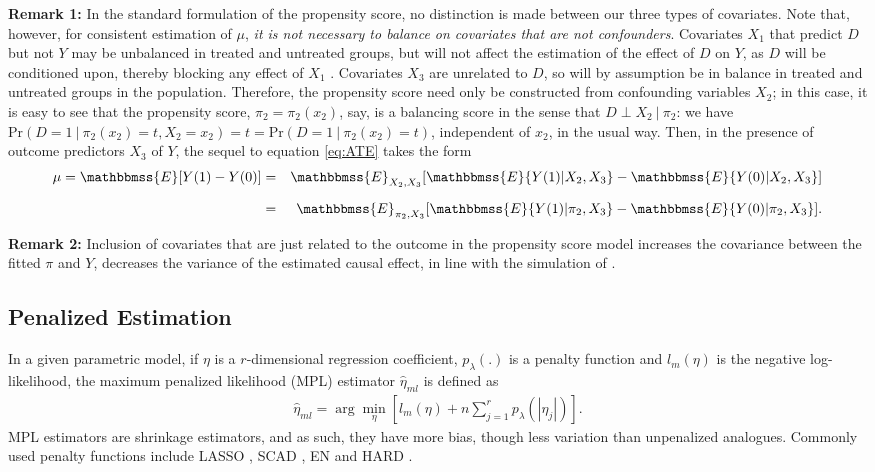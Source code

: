 \documentclass[11pt]{statsoc}
\begin{document}
\medskip

\noindent \textbf{Remark 1:} In the standard formulation of the propensity score, no distinction is made between our three types of covariates.  Note that, however, for consistent estimation of $\mu$, \textit{it is not necessary to
balance on covariates that are not confounders}. Covariates $X_1$ that predict $D$ but not $Y$ may be unbalanced in treated and untreated groups, but will not affect the estimation of the effect of $D$ on $Y$, as $D$ will be conditioned
upon, thereby blocking any effect of $X_1$ \citep{de2011covariate}.  Covariates $X_3$ are unrelated to
$D$, so will by assumption be in balance in treated and untreated groups in the population. Therefore, the propensity score need only be constructed from confounding variables $X_2$; in this case, it is easy to see that the
propensity score, $\pi_{2}=\pi_2(x_2) $, say, is a balancing score in the sense that $D\perp X_2 \: | \: \pi_{2}$:  we have ${\text{Pr}}(D=1\:|\:\pi_{2}(x_2)=t,X_2=x_2) = t =
{\text{Pr}}(D=1\:|\:\pi_{2}(x_2)=t)$, independent of $x_2$, in the usual way.  Then, in the presence of outcome predictors $X_3$ of $Y$, the sequel to equation \eqref{eq:ATE}
takes the form
\begin{eqnarray}
\mu = {\mathbbmss{E}}[Y(1)-Y(0)] & = & {\mathbbmss{E}}_{X_2,X_3}[{\mathbbmss{E}}\{Y(1)|X_2,X_3\}-{\mathbbmss{E}}\{Y(0)|X_2,X_3\}] \nonumber\\[6pt]
& = & {\mathbbmss{E}}_{\pi_{2},X_3}[{\mathbbmss{E}}\{Y(1)|\pi_{2},X_3\}-{\mathbbmss{E}}\{Y(0)|\pi_{2},X_3\}].
\label{eq:ATE2}
\end{eqnarray}

\noindent \textbf{Remark 2:} Inclusion of covariates that are just related to the outcome in the propensity score model increases the covariance between the fitted $\pi$ and $Y$, decreases the variance of the estimated causal effect, in line with the simulation of \cite{brookhart2006variable}.  

\subsection{Penalized Estimation}

In a given parametric model, if $\eta$ is a $r$-dimensional regression coefficient,  $p_{\lambda}(.)$ is a penalty function and $l_m(\eta)$ is the negative log-likelihood, the maximum penalized likelihood (MPL) estimator $\widehat \eta_{ml}$ is defined as
\begin{align*}
\widehat \eta_{ml}=\arg \min_{\eta} \left [l_m(\eta)+n\sum_{j=1}^r p_{\lambda}(|\eta_j|) \right ].
\end{align*}
MPL estimators are shrinkage estimators, and as such, they have more bias, though less variation than unpenalized analogues. Commonly used penalty functions include LASSO \citep{tibshirani1996regression}, SCAD
\citep{fan2001variable}, EN \citep{zou2005regularization} and HARD \citep{antoniadis1997wavelets}. 
\end{document}
